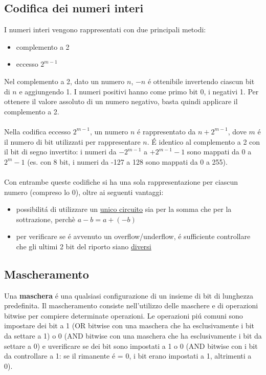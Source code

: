 \documentclass{article}
\begin{document}
\subsection{Codifica dei numeri interi}
I numeri interi vengono rappresentati con due principali metodi:
\begin{itemize}
	\item complemento a 2
	\item eccesso $2^{m-1}$
\end{itemize}
Nel complemento a 2, dato un numero $n$, $-n$ é ottenibile invertendo ciascun bit di $n$ e aggiungendo 1. I numeri positivi hanno come primo bit 0, i negativi 1. Per ottenere il valore assoluto di un numero negativo, basta quindi applicare il complemento a 2.\\\\
Nella codifica eccesso $2^{m-1}$, un numero $n$ é rappresentato da $n + 2^{m-1}$, dove $m$ é il numero di bit utilizzati per rappresentare $n$. É identico al complemento a 2 con il bit di segno invertito: i numeri da $-2^{m-1}$ a $+2^{m-1}-1$ sono mappati da $0$ a $2^{m}-1$ (es. con 8 bit, i numeri da -127 a 128 sono mappati da 0 a 255).\\\\
Con entrambe queste codifiche si ha una sola rappresentazione per ciascun numero (compreso lo 0), oltre ai seguenti vantaggi:
\begin{itemize}
	\item possibilitá di utilizzare un \underline{unico circuito} sia per la somma che per la sottrazione, perchè $a-b=a+(-b)$
	\item per verificare se é avvenuto un overflow/underflow, é sufficiente controllare che gli ultimi 2 bit del riporto siano \underline{diversi}
\end{itemize}

\subsection{Mascheramento}
Una \textbf{maschera} é una qualsiasi configurazione di un insieme di bit di lunghezza predefinita. Il mascheramento consiste nell'utilizzo delle maschere e di operazioni bitwise per compiere determinate operazioni. Le operazioni piú comuni sono impostare dei bit a 1 (OR bitwise con una maschera che ha esclusivamente i bit da settare a 1) o 0 (AND bitwise con una maschera che ha esclusivamente i bit da settare a 0) e uverificare se dei bit sono impostati a 1 o 0 (AND bitwise con i bit da controllare a 1: se il rimanente é = 0, i bit erano impostati a 1, altrimenti a 0).
\end{document}
